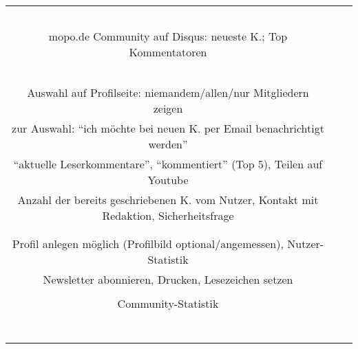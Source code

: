 \begin{landscape}
\begin{tabular}{ccc}
{		\\
		\\
		\\
		&
		\\
		\\
		mopo.de Community auf Disqus: neueste K.; Top Kommentatoren\\
		\\
		\\
		\\
		&
		\\
		\\
		Auswahl auf Profilseite: niemandem/allen/nur Mitgliedern zeigen\\
		zur Auswahl: ``ich möchte bei neuen K. per Email benachrichtigt werden'' \\
		``aktuelle Leserkommentare'', ``kommentiert'' (Top 5), Teilen auf Youtube\\
		Anzahl der bereits geschriebenen K. vom Nutzer, Kontakt mit Redaktion, Sicherheitsfrage\\
		&
		\\
		\\
		Profil anlegen möglich (Profilbild optional/angemessen), Nutzer-Statistik\\
		Newsletter abonnieren, Drucken, Lesezeichen setzen\\
		\\
		Community-Statistik\\
		&
		\\
		\\
		\\
		\\
		\\
		\\
		&
		
		\\ \hline
		
		


\end{tabular}
\end{landscape}
